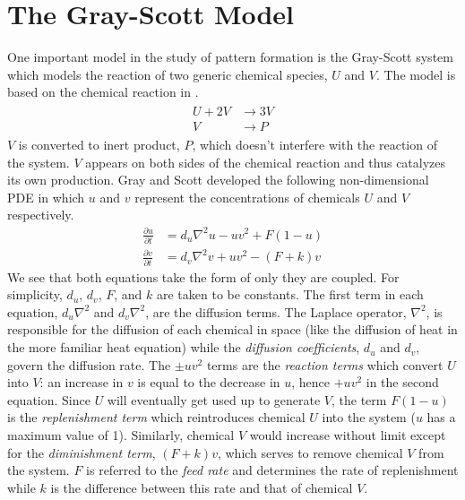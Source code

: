 \section{The Gray-Scott Model} \label{sect:gsmodel}
	One important model in the study of pattern formation is the Gray-Scott system which models the reaction of two generic chemical species, $U$ and $V$. The model is based on the chemical reaction in .
	\begin{align}
	\begin{split}
		U + 2V &\rightarrow 3V \\
		V &\rightarrow P
		\label{eq:gs-chem}
	\end{split}
	\end{align}
$V$ is converted to inert product, $P$, which doesn't interfere with the reaction of the system. $V$ appears on both sides of the chemical reaction and thus catalyzes its own production. Gray and Scott developed the following non-dimensional PDE in which $u$ and $v$ represent the concentrations of chemicals $U$ and $V$ respectively.
	\begin{align}\label{eq:gs}
		\frac{\partial u}{\partial t} & = d_u \nabla^2 u - uv^2 + F(1-u) \\
		\frac{\partial v}{\partial t} & = d_v \nabla^2 v  + uv^2 - (F +k)v
	\end{align}
We see that both equations take the form of  only they are coupled. For simplicity, $d_u$, $d_v$, $F$, and $k$ are taken to be constants. The first term in each equation, $d_u \nabla^2$ and $d_v \nabla^2$, are the diffusion terms. The Laplace operator, $\nabla^2$, is responsible for the diffusion of each chemical in space (like the diffusion of heat in the more familiar heat equation) while the \textit{diffusion coefficients}, $d_u$ and $d_v$, govern the diffusion rate. The $\pm uv^2$ terms are the  \textit{reaction terms} which convert $U$ into $V$: an increase in $v$ is equal to the decrease in $u$, hence $+uv^2$ in the second equation. Since $U$ will eventually get used up to generate $V$, the term $F(1-u)$ is the \textit{replenishment term} which reintroduces chemical $U$ into the system ($u$ has a maximum value of 1). Similarly, chemical $V$ would increase without limit except for the \textit{diminishment term}, $(F+k)v$, which serves to remove chemical $V$ from the system. $F$ is referred to the \textit{feed rate} and determines the rate of replenishment while $k$ is the difference between this rate and that of chemical $V$.

